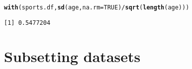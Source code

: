 \documentclass[12pt,a4paper]{article}\usepackage[]{graphicx}\usepackage[]{color}
\makeatletter
\newcommand{\hlnum}[1]{\textcolor[rgb]{0.686,0.059,0.569}{#1}}%
\newcommand{\hlopt}[1]{\textcolor[rgb]{0,0,0}{#1}}%
\newcommand{\hlstd}[1]{\textcolor[rgb]{0.345,0.345,0.345}{#1}}%
\newcommand{\hlkwc}[1]{\textcolor[rgb]{0.333,0.667,0.333}{#1}}%
\newcommand{\hlkwd}[1]{\textcolor[rgb]{0.737,0.353,0.396}{\textbf{#1}}}%
\newenvironment{kframe}{%
 \def\at@end@of@kframe{}%
 \ifinner\ifhmode%
  \def\at@end@of@kframe{\end{minipage}}%
  \begin{minipage}{\columnwidth}%
 \fi\fi%
 \def\FrameCommand##1{\hskip\@totalleftmargin \hskip-\fboxsep
 \colorbox{shadecolor}{##1}\hskip-\fboxsep
     \hskip-\linewidth \hskip-\@totalleftmargin \hskip\columnwidth}%
 \MakeFramed {\advance\hsize-\width
   \@totalleftmargin\z@ \linewidth\hsize
   \@setminipage}}%
 {\par\unskip\endMakeFramed%
 \at@end@of@kframe}
\newenvironment{knitrout}{}{} %
\makeatother
\begin{document}
\begin{enumerate}[(i)]
\begin{knitrout}
\color{fgcolor}\begin{kframe}
\begin{alltt}
\hlkwd{with}\hlstd{(sports.df,} \hlkwd{sd}\hlstd{(age,}\hlkwc{na.rm} \hlstd{=} \hlnum{TRUE}\hlstd{)}\hlopt{/}\hlkwd{sqrt}\hlstd{(}\hlkwd{length}\hlstd{(age)))}
\end{alltt}
\begin{verbatim}
[1] 0.5477204
\end{verbatim}
\end{kframe}
\end{knitrout}

\end{enumerate}
 
\section{Subsetting datasets}
\label{sec:sub}
\end{document}
